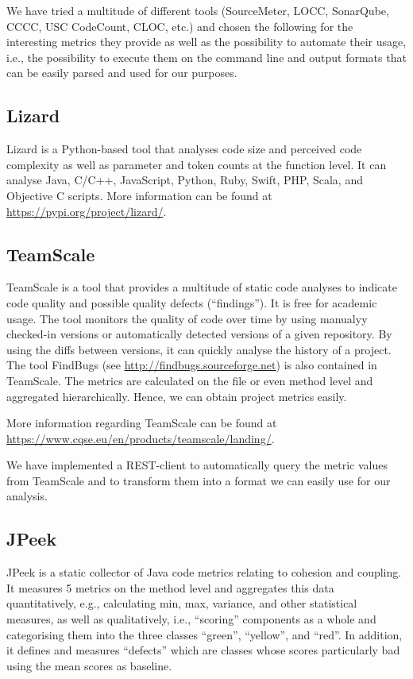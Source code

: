 \documentclass{scrartcl}
\begin{document}
We have tried a multitude of different tools (SourceMeter, LOCC, SonarQube,
CCCC, USC CodeCount, CLOC, etc.) and chosen the following for the interesting
metrics they provide as well as the possibility to automate their usage, i.e.,
the possibility to execute them on the command line and output formats that can
be easily parsed and used for our purposes.

\subsection{Lizard}
\label{sec:lizard}

Lizard is a Python-based tool that analyses code size and perceived code
complexity as well as parameter and token counts at the function level. It can
analyse Java, C/C++, JavaScript, Python, Ruby, Swift, PHP, Scala, and Objective
C scripts.  More information can be found at
\url{https://pypi.org/project/lizard/}.

\subsection{TeamScale}
\label{sec:teamscale}

TeamScale is a tool that provides a multitude of static code analyses to
indicate code quality and possible quality defects (\enquote{findings}). It is
free for academic usage. The tool monitors the quality of code over time by
using manualyy checked-in versions or automatically detected versions of a given
repository. By using the diffs between versions, it can quickly analyse the
history of a project. The tool FindBugs (see
\url{http://findbugs.sourceforge.net}) is also contained in TeamScale. The
metrics are calculated on the file or even method level and aggregated
hierarchically. Hence, we can obtain project metrics easily.

More information regarding TeamScale can be found at
\url{https://www.cqse.eu/en/products/teamscale/landing/}.

We have implemented a REST-client to automatically query the metric values from
TeamScale and to transform them into a format we can easily use for our
analysis.

\subsection{JPeek}
\label{sec:jpeek}

JPeek is a static collector of Java code metrics relating to cohesion and
coupling. It measures 5 metrics on the method level and aggregates this data
quantitatively, e.g., calculating min, max, variance, and other statistical
measures,  as well as qualitatively, i.e., \enquote{scoring} components as a
whole and categorising them into the three classes \enquote{green},
\enquote{yellow}, and \enquote{red}. In addition, it defines and measures
\enquote{defects} which are classes whose scores particularly bad using the mean
scores as baseline.  
\end{document}
